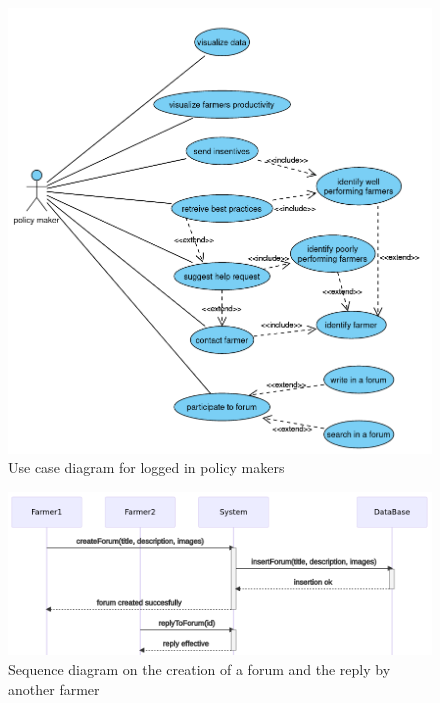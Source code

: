 \begin{figure}
	\centering
	\includegraphics[width=\textwidth]{Images/use-case-policy.png}
	\caption{\label{fig:usecasepolicymakers}Use case diagram for logged in policy makers}
\end{figure}


\begin{figure}
	\centering
	\includegraphics[width=\textwidth]{Images/seq-create-forum.png}
	\caption{\label{fig:seqcreationforum} Sequence diagram on the creation of a forum and the reply by another farmer}
\end{figure}

